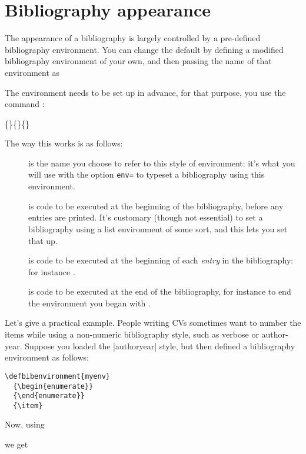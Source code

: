 \section{Bibliography appearance}

The appearance of a bibliography is largely controlled by a
pre-defined bibliography environment. You can change the default by
defining a modified bibliography environment of your own, and then
passing the name of that environment as
\begin{center}
\end{center}

The environment needs to be set up in advance, for that purpose, you
use the command :
\begin{center}
\{\}\{\}\{\}
\end{center}

The way this works is as follows:
\begin{description}
\item[] is the name you choose to refer to this style of
  environment: it's what you will use with the option \texttt{env=} to
  typeset a bibliography using this environment.
\item[] is code to be executed at the beginning of the
  bibliography, before any entries are printed. It's customary (though
  not essential) to set a bibliography using a list environment of
  some sort, and this lets you set that up.
\item[] is code to be executed at the beginning of each
  \emph{entry} in the bibliography: for instance .
\item[] is code to be executed at the end of the
  bibliography, for instance to end the environment you began with
  .
\end{description}

Let's give a practical example. People writing CVs sometimes want to
number the items while using a non-numeric bibliography style, such as
verbose or author-year. Suppose you loaded the |authoryear| style, but
then defined a bibliography environment as follows:
\begin{verbatim}
\defbibenvironment{myenv}
  {\begin{enumerate}}
  {\end{enumerate}}
  {\item}
\end{verbatim}
Now, using
\begin{pseudoverb}
\relax[env=myenv,heading=myheading]
\end{pseudoverb}
we get


